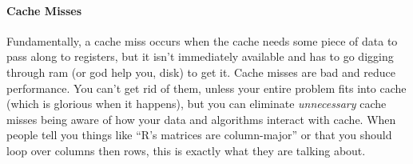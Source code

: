\paragraph{Cache Misses} Fundamentally, a cache miss occurs when the cache 
needs some piece of data to pass along to registers, but it isn't immediately 
available and has to go digging through ram (or god help you, disk) to get it.  
Cache misses are bad and reduce performance.  You can't get rid of them, unless 
your entire problem fits into cache (which is glorious when it happens), but you 
can eliminate \emph{unnecessary} cache misses being aware of how your data and 
algorithms interact with cache.  When people tell you things like ``R's matrices 
are column-major'' or that you should loop over columns then rows, this is 
exactly what they are talking about.
